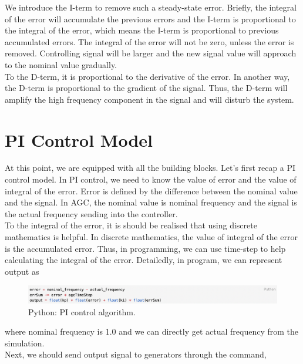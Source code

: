 \documentclass{report}
\begin{document}
We introduce the I-term to remove such a steady-state error. Briefly, the integral of the error will accumulate the previous errors and the I-term is proportional to the integral of the error, which means the I-term is proportional to previous accumulated errors. The integral of the error will not be zero, unless the error is removed. Controlling signal will be larger and the new signal value will approach to the nominal value gradually.\\

To the D-term, it is proportional to the derivative of the error. In another way, the D-term is proportional to the gradient of the signal. Thus, the D-term will amplify the high frequency component in the signal and will disturb the system.\\


\section{PI Control Model} %
At this point, we are equipped with all the building blocks. Let’s first recap a PI control model. In PI control, we need to know the value of error and the value of integral of the error. Error is defined by the difference between the nominal value and the signal. In AGC, the nominal value is nominal frequency and the signal is the actual frequency sending into the controller.\\

To the integral of the error,  it is should be realised that using discrete mathematics is helpful. In discrete mathematics, the value of integral of the error is the accumulated error. Thus, in programming, we can use time-step to help calculating the integral of the error.  Detailedly, in program, we can represent output as\\

\begin{figure}[htbp]
\centering
\includegraphics[width = .999\textwidth]{figure/3_3_code1.png}
\caption{Python: PI control algorithm.}
\label{3_3_code1}
\end{figure}

where nominal frequency is 1.0 and we can directly get actual frequency from the simulation.\\

Next, we should send output signal to generators through the command,\\
\end{document}
